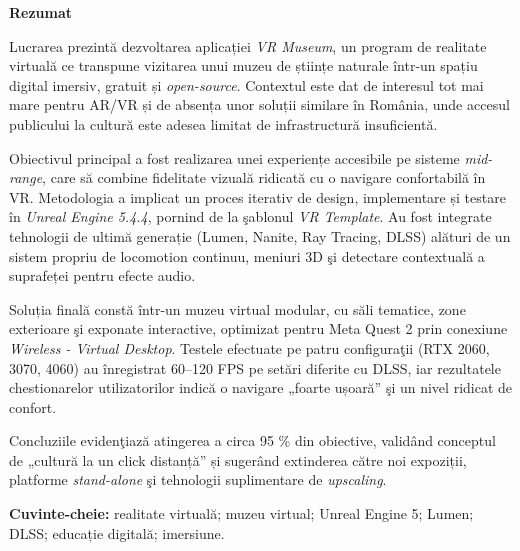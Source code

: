 \newpage
\begin{center}
    \LARGE
    \textbf{\thesistitle}
    
    \vspace{0.5cm}
    
    \authornamefl
    
    \vspace{1cm}
    
    \textbf{Rezumat}
    
    \vspace{1cm}
\end{center}

Lucrarea prezintă dezvoltarea aplicației \textit{VR Museum}, un program de realitate virtuală ce transpune vizitarea unui muzeu de științe naturale într-un spațiu digital imersiv, gratuit și \textit{open-source}. Contextul este dat de interesul tot mai mare pentru AR/VR și de absența unor soluții similare în România, unde accesul publicului la cultură este adesea limitat de infrastructură insuficientă.  

Obiectivul principal a fost realizarea unei experiențe accesibile pe sisteme \emph{mid-range}, care să combine fidelitate vizuală ridicată cu o navigare confortabilă în VR. Metodologia a implicat un proces iterativ de design, implementare și testare în \textit{Unreal Engine 5.4.4}, pornind de la şablonul \emph{VR Template}. Au fost integrate tehnologii de ultimă generație (Lumen, Nanite, Ray Tracing, DLSS) alături de un sistem propriu de locomotion continuu, meniuri 3D şi detectare contextuală a suprafeței pentru efecte audio.  

Soluția finală constă într-un muzeu virtual modular, cu săli tematice, zone exterioare şi exponate interactive, optimizat pentru Meta Quest 2 prin conexiune \emph{Wireless - Virtual Desktop}. Testele efectuate pe patru configuraţii (RTX 2060, 3070, 4060) au înregistrat 60–120 FPS pe setări diferite cu DLSS, iar rezultatele chestionarelor utilizatorilor indică o navigare „foarte ușoară” şi un nivel ridicat de confort.  

Concluziile evidenţiază atingerea a circa 95 \% din obiective, validând conceptul de „cultură la un click distanță” și sugerând extinderea către noi expoziții, platforme \emph{stand-alone} şi tehnologii suplimentare de \emph{upscaling}.  

\vspace{0.5cm}
\noindent\textbf{Cuvinte-cheie:} realitate virtuală; muzeu virtual; Unreal Engine 5; Lumen; DLSS; educație digitală; imersiune.
